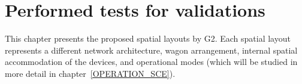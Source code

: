 

\chapter{Performed tests for validations} \label{SPATIAL_LAYOUT}
This chapter presents the proposed spatial layouts by G2. Each spatial layout represents a different network architecture, wagon arrangement, internal spatial accommodation of the devices, and operational modes (which will be studied in more detail in chapter~\ref{OPERATION_SCE}).
\newpage




